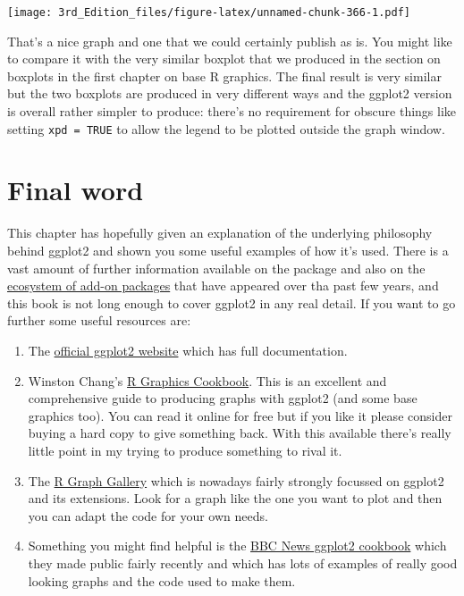 \documentclass[
]{book}
\providecommand{\tightlist}{%
  \setlength{\itemsep}{0pt}\setlength{\parskip}{0pt}}
\begin{document}
\texttt{[image: 3rd\_Edition\_files/figure-latex/unnamed-chunk-366-1.pdf]}

That's a nice graph and one that we could certainly publish as is. You might like to compare it with the very similar boxplot that we produced in the section on boxplots in the first chapter on base R graphics. The final result is very similar but the two boxplots are produced in very different ways and the ggplot2 version is overall rather simpler to produce: there's no requirement for obscure things like setting \texttt{xpd\ =\ TRUE} to allow the legend to be plotted outside the graph window.

\hypertarget{final-word}{%
\section{Final word}\label{final-word}}

This chapter has hopefully given an explanation of the underlying philosophy behind ggplot2 and shown you some useful examples of how it's used. There is a vast amount of further information available on the package and also on the \href{https://exts.ggplot2.tidyverse.org/gallery/}{ecosystem of add-on packages} that have appeared over tha past few years, and this book is not long enough to cover ggplot2 in any real detail. If you want to go further some useful resources are:

\begin{enumerate}
\def\labelenumi{\arabic{enumi})}
\tightlist
\item
  The \href{https://ggplot2.tidyverse.org/index.html}{official ggplot2 website} which has full documentation.
\item
  Winston Chang's \href{https://r-graphics.org/}{R Graphics Cookbook}. This is an excellent and comprehensive guide to producing graphs with ggplot2 (and some base graphics too). You can read it online for free but if you like it please consider buying a hard copy to give something back. With this available there's really little point in my trying to produce something to rival it.
\item
  The \href{https://www.r-graph-gallery.com/index.html}{R Graph Gallery} which is nowadays fairly strongly focussed on ggplot2 and its extensions. Look for a graph like the one you want to plot and then you can adapt the code for your own needs.
\item
  Something you might find helpful is the \href{https://bbc.github.io/rcookbook/\#how_to_create_bbc_style_graphics}{BBC News ggplot2 cookbook} which they made public fairly recently and which has lots of examples of really good looking graphs and the code used to make them.
\end{enumerate}
\end{document}
